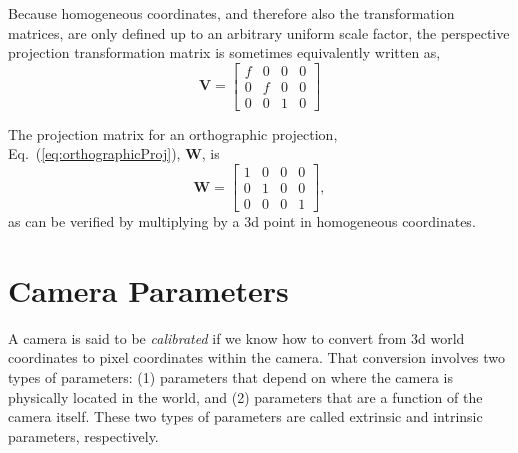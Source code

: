 Because homogeneous coordinates, and therefore also the transformation matrices, are only defined up to an arbitrary uniform scale factor, the perspective projection transformation matrix is sometimes equivalently written as,
\begin{equation}
    \mathbf{V} =             \left [
    \begin{array}{cccc}
    f & 0 & 0 & 0 \\
    0 & f & 0 & 0 \\
    0 & 0 & 1 & 0
    \end{array}
    \right ]
    \label{eq:homogPerspective}
\end{equation}


The projection matrix for an orthographic projection, Eq.~(\ref{eq:orthographicProj}), $\mathbf{W}$, is
\begin{equation}
\mathbf{W} =         \left [
    \begin{array}{cccc}
    1 & 0 & 0 & 0 \\
    0 & 1 & 0 & 0 \\
    0 & 0 & 0 & 1
    \end{array}
    \right ],
\end{equation}
as can be verified by multiplying by a 3d point in homogeneous coordinates.


\section{Camera Parameters}
A camera is said to be {\em calibrated} if we know how to convert from 3d world coordinates to pixel coordinates within the camera. That conversion involves two types of parameters:  (1) parameters that depend on where the camera is physically located in the world, and (2) parameters that are a function of the camera itself.  These two types of parameters are called extrinsic and intrinsic parameters, respectively.


